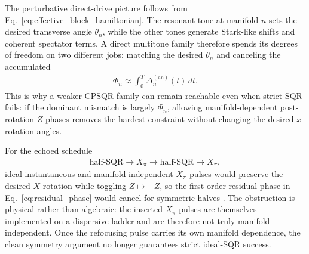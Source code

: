 \documentclass[aps,pra,twocolumn,reprint,floatfix,amsmath,amssymb]{revtex4-2}
\begin{document}
The perturbative direct-drive picture follows from Eq.~\eqref{eq:effective_block_hamiltonian}. The resonant tone at manifold $n$ sets the desired transverse angle $\theta_n$, while the other tones generate Stark-like shifts and coherent spectator terms. A direct multitone family therefore spends its degrees of freedom on two different jobs: matching the desired $\theta_n$ and canceling the accumulated
\begin{align}
\Phi_n \approx \int_0^T \Delta_n^{(\mathrm{ac})}(t)\,dt.
\label{eq:residual_phase}
\end{align}
This is why a weaker CPSQR family can remain reachable even when strict SQR fails: if the dominant mismatch is largely $\Phi_n$, allowing manifold-dependent post-rotation $Z$ phases removes the hardest constraint without changing the desired $x$-rotation angles.

For the echoed schedule
\begin{align}
\text{half-SQR} \rightarrow X_\pi \rightarrow \text{half-SQR} \rightarrow X_\pi,
\label{eq:echo_schedule}
\end{align}
ideal instantaneous and manifold-independent $X_\pi$ pulses would preserve the desired $X$ rotation while toggling $Z\mapsto -Z$, so the first-order residual phase in Eq.~\eqref{eq:residual_phase} would cancel for symmetric halves \cite{hahn1950echo}. The obstruction is physical rather than algebraic: the inserted $X_\pi$ pulses are themselves implemented on a dispersive ladder and are therefore not truly manifold independent. Once the refocusing pulse carries its own manifold dependence, the clean symmetry argument no longer guarantees strict ideal-SQR success.
\end{document}
